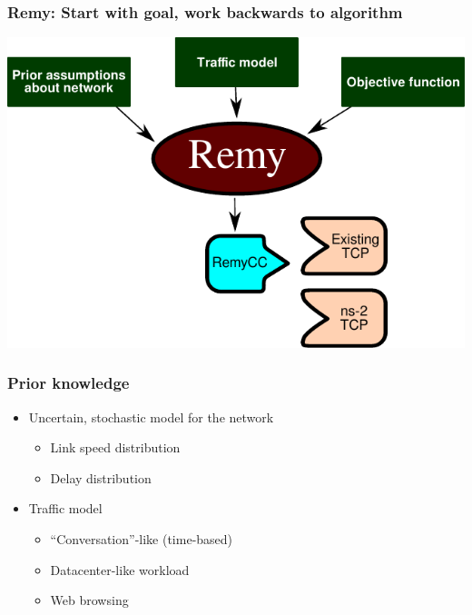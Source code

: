 \documentclass[svgnames]{beamer}
\begin{document}
\begin{frame}
\frametitle{Remy: Start with goal, work backwards to algorithm}

\begin{centering}
\includegraphics[scale=.6]{remy.pdf}

\end{centering}

\end{frame}

\begin{frame}
\frametitle{Prior knowledge}

\begin{itemize}

\item Uncertain, stochastic model for the network

\begin{itemize}
\item Link speed distribution
\item Delay distribution

\end{itemize}

\item Traffic model

\begin{itemize}
\item ``Conversation''-like (time-based)
\item Datacenter-like workload
\item Web browsing
\end{itemize}

\end{itemize}

\end{frame}
\end{document}
